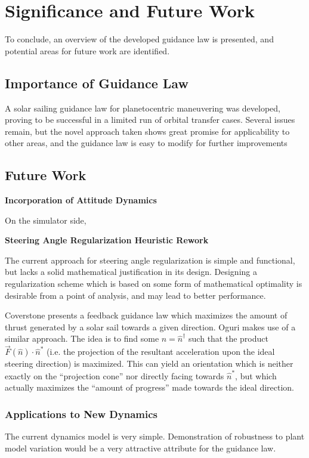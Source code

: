 \chapter{Significance and Future Work}

To conclude, an overview of the developed guidance law is presented, and potential areas for future work are identified.


\section{Importance of Guidance Law}
A solar sailing guidance law for planetocentric maneuvering was developed, proving to be successful in a limited run of orbital transfer cases. Several issues remain, but the novel approach taken shows great promise for applicability to other areas, and the guidance law is easy to modify for further improvements


\section{Future Work}


\textbf{Incorporation of Attitude Dynamics}

On the simulator side,

\textbf{Steering Angle Regularization Heuristic Rework}

The current approach for steering angle regularization is simple and functional, but lacks a solid mathematical justification in its design. Designing a regularization scheme which is based on some form of mathematical optimality is desirable from a point of analysis, and may lead to better performance.

Coverstone \cite{coverstone2003technique} presents a feedback guidance law which maximizes the amount of thrust generated by a solar sail towards a given direction. Oguri \cite{oguri2023solar} makes use of a similar approach. The idea is to find some $\hat{n} = \hat{n}^\dagger$ such that the product $\vec{F}(\hat{n}) \cdot \hat{n}^*$ (i.e. the projection of the resultant acceleration upon the ideal steering direction) is maximized. This can yield an orientation which is neither exactly on the ``projection cone'' nor directly facing towards $\hat{n}^*$, but which actually maximizes the ``amount of progress'' made towards the ideal direction.



\subsection{Applications to New Dynamics}
The current dynamics model is very simple. Demonstration of robustness to plant model variation would be a very attractive attribute for the guidance law.


